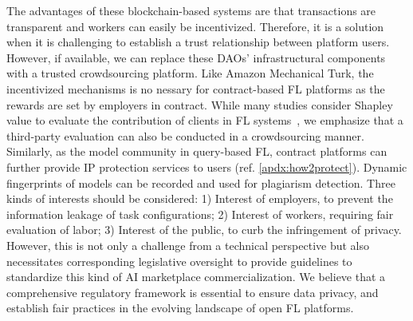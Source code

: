 \documentclass[journal]{IEEEtran}
\begin{document}
The advantages of these blockchain-based systems are that transactions are transparent and workers can easily be incentivized.
Therefore, it is a solution when it is challenging to establish a trust relationship between platform users. 
However, if available, we can replace these DAOs' infrastructural components with a trusted crowdsourcing platform.
Like Amazon Mechanical Turk, the incentivized mechanisms is no nessary for contract-based FL platforms as the rewards are set by employers in contract.
While many studies consider Shapley value to evaluate the contribution of clients in FL systems~\cite{zhan2021survey}, we emphasize that a third-party evaluation can also be conducted in a crowdsourcing manner.
Similarly, as the model community in query-based FL, contract platforms can further provide IP protection services to users (ref. \ddag\ref{apdx:how2protect}). 
Dynamic fingerprints of models can be recorded and used for plagiarism detection.
Three kinds of interests should be considered: 1) Interest of employers, to prevent the information leakage of task configurations; 2) Interest of workers, requiring fair evaluation of labor; 3) Interest of the public, to curb the infringement of privacy.
However, this is not only a challenge from a technical perspective but also necessitates corresponding legislative oversight to provide guidelines to standardize this kind of AI marketplace commercialization.
We believe that a comprehensive regulatory framework is essential to ensure data privacy, and establish fair practices in the evolving landscape of open FL platforms.




\vfill
\end{document}
